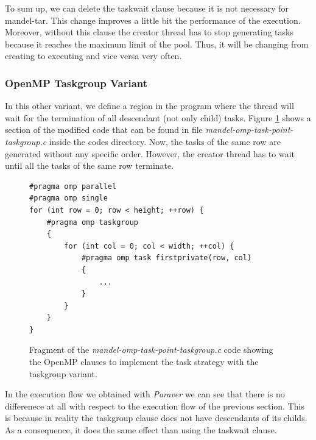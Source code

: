 \documentclass[12pt, a4paper]{article}
\begin{document}
To sum up, we can delete the taskwait clause because it is not necessary for mandel-tar. This change improves a little bit the performance of the execution. Moreover, without this clause the creator thread has to stop generating tasks because it reaches the maximum limit of the pool. Thus, it will be changing from creating to executing and vice versa very often.

\subsubsection{OpenMP Taskgroup Variant}

In this other variant, we define a region in the program where the thread will wait for the termination of all descendant (not only child) tasks. Figure \ref{code:task_implementation_point_taskgroup} shows a section of the modified code that can be found in file \textit{mandel-omp-task-point-taskgroup.c} inside the codes directory. Now, the tasks of the same row are generated without any specific order. However, the creator thread has to wait until all the tasks of the same row terminate.

\begin{figure}[H]
\begin{lstlisting}
#pragma omp parallel
#pragma omp single
for (int row = 0; row < height; ++row) {
	#pragma omp taskgroup
	{
		for (int col = 0; col < width; ++col) {
        	#pragma omp task firstprivate(row, col)
        	{
        		...
			}
		}
	}
}
\end{lstlisting}
\caption{Fragment of the \textit{mandel-omp-task-point-taskgroup.c} code showing the OpenMP clauses to implement the task strategy with the taskgroup variant.}
\label{code:task_implementation_point_taskgroup}
\end{figure}

In the execution flow we obtained with \textit{Paraver} we can see that there is no differenece at all with respect to the execution flow of the previous section. This is because in reality the taskgroup clause does not have descendants of its childs. As a consequence, it does the same effect than using the taskwait clause.
\end{document}
